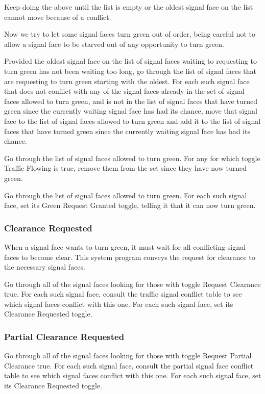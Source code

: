 \documentclass[letterpaper,twoside]{article}
\begin{document}
Keep doing the above until the list is empty or the oldest signal
face on the list cannot move because of a conflict.

Now we try to let some signal faces turn green out of order, being
careful not to allow a signal face to be starved out of any
opportunity to turn green.

Provided the oldest signal face on the list of signal faces
waiting to requesting to turn green has not been waiting too long,
go through the list of signal faces that are requesting to turn green
starting with the oldest.  For each such signal face that does not
conflict with any of the signal faces already in the set of signal
faces allowed to turn green, and is not in the list of signal faces
that have turned green since the currently waiting signal face has
had its chance, move that signal face to the list of signal faces
allowed to turn green and add it to the list of signal faces that have
turned green since the currently waiting signal face has had its
chance.

Go through the list of signal faces allowed to turn green.  For any
for which toggle Traffic Flowing is true, remove them from the set
since they have now turned green.

Go through the list of signal faces allowed to turn green.  For each
such signal face, set its Green Request Granted toggle, telling it
that it can now turn green.

\subsubsection{Clearance Requested}

When a signal face wants to turn green, it must wait for all conflicting
signal faces to become clear.  This system program conveys the request
for clearance to the necessary signal faces.

Go through all of the signal faces looking for those with toggle
Request Clearance true.  For each such signal face, consult the traffic
signal conflict table to see which signal faces conflict with this one.
For each such signal face, set its Clearance Requested toggle.

\subsubsection{Partial Clearance Requested}

Go through all of the signal faces looking for those with toggle
Request Partial Clearance true.  For each such signal face, consult the
partial signal face conflict table to see which signal faces conflict
with this one.
For each such signal face, set its Clearance Requested toggle.
\end{document}
